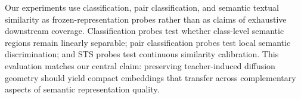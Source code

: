 Our experiments use classification, pair classification, and semantic textual similarity as frozen-representation probes rather than as claims of exhaustive downstream coverage. Classification probes test whether class-level semantic regions remain linearly separable; pair classification probes test local semantic discrimination; and STS probes test continuous similarity calibration. This evaluation matches our central claim: preserving teacher-induced diffusion geometry should yield compact embeddings that transfer across complementary aspects of semantic representation quality.
